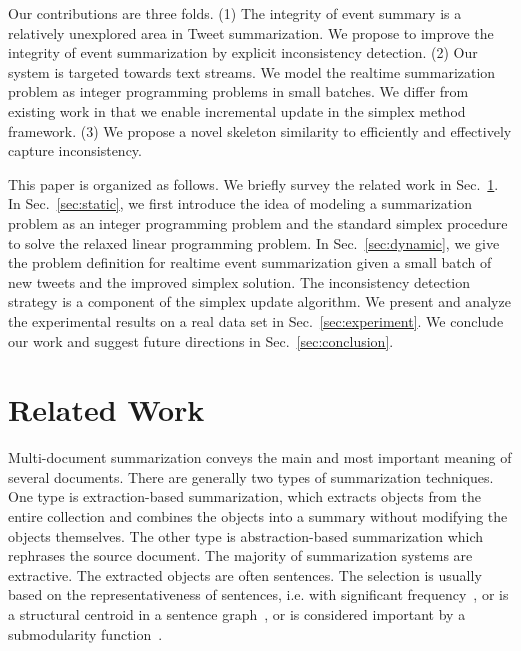 \documentclass[envcountsame]{llncs}
\begin{document}
Our contributions are three folds. (1) The integrity of event summary is a relatively unexplored area in Tweet summarization. We propose to improve the integrity of event summarization by explicit inconsistency detection. (2) Our system is targeted towards text streams. We model the realtime summarization problem as integer programming problems in small batches. We differ from existing work in that we enable incremental update in the simplex method framework. (3) We propose a novel skeleton similarity to efficiently and effectively capture inconsistency.

This paper is organized as follows. We briefly survey the related work in Sec.~\ref{sec:related}. In Sec.~\ref{sec:static}, we first introduce the idea of modeling a summarization problem as an integer programming problem and the standard simplex procedure to solve the relaxed linear programming problem. In Sec.~\ref{sec:dynamic}, we give the problem definition for realtime event summarization given a small batch of new tweets and the improved simplex solution. The inconsistency detection strategy is a component of the simplex update algorithm. We present and analyze the experimental results on a real data set in Sec.~\ref{sec:experiment}. We conclude our work and suggest future directions in Sec.~\ref{sec:conclusion}.

\section{Related Work}\label{sec:related}

Multi-document summarization conveys the main and most important meaning of several documents. There are generally two types of summarization techniques. One type is extraction-based summarization, which extracts objects from the entire collection and combines the objects into a summary without modifying the objects themselves. The other type is abstraction-based summarization which rephrases the source document. The majority of summarization systems are extractive. The extracted objects are often sentences. The selection is usually based on the representativeness of sentences, i.e. with significant frequency~\cite{Yih2007Multi-document}, or is a structural centroid in a sentence graph~\cite{Lin2012Generating}, or is considered important by a submodularity function~\cite{MSSF}. 
\end{document}
